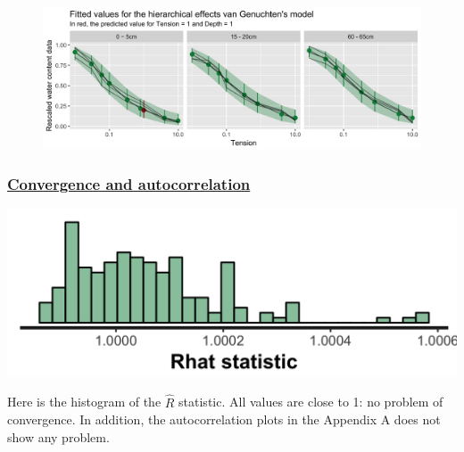 \documentclass{article}
\begin{document}
\begin{figure}[ht!]
\centering
\includegraphics[width=16cm]{hier_3pars_pred.png}
\end{figure}

\subsubsection*{\underline{Convergence and autocorrelation}}
\begin{minipage}{0.50\textwidth}
\includegraphics[width=\linewidth]{hier_3pars_rhat.png}
\end{minipage}
\begin{minipage}{0.50\textwidth}
Here is the histogram of the $\widehat{R}$ statistic. All values are close to 1: no problem of convergence. In addition, the autocorrelation plots in the Appendix A does not show any problem.
\end{minipage}
\end{document}
